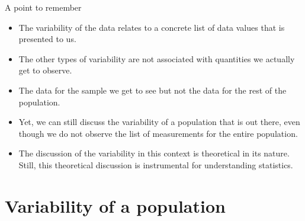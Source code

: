 \documentclass[10pt]{beamer}\usepackage[]{graphicx}\usepackage[]{color}
\begin{document}
\begin{frame}{A point to remember}
	
	\begin{itemize}[<+->]
		
		\item The variability of the data relates to a concrete list of data values that is presented to us. 
		\item The other types of variability are
		not associated with quantities we actually get to observe. 
		\item  The data for
		the sample we get to see but not the data for the rest of the
		population. 
		\item Yet, we can still discuss the variability of a population
		that is out there, even though we do not observe the list of
		measurements for the entire population. 
		\item The discussion of the variability in this context
		is theoretical in its nature. Still, this theoretical discussion is
		instrumental for understanding statistics.
	\end{itemize}
	
\end{frame}



\section{Variability of a population}
\end{document}
